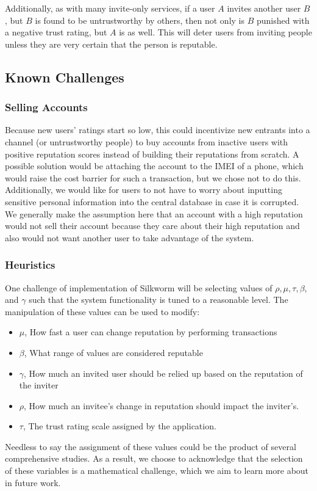 \documentclass[letterpaper,twocolumn,10pt]{article}
\begin{document}
Additionally, as with many invite-only services, if a user $A$ invites another user $B$, but $B$ is found to be untrustworthy by others, then not only is $B$ punished with a negative trust rating, but $A$ is as well. This will deter users from inviting people unless they are very certain that the person is reputable.

\subsection{Known Challenges}

\subsubsection{Selling Accounts}
Because new users' ratings start so low, this could incentivize new entrants into a channel (or untrustworthy people) to buy accounts from inactive users with positive reputation scores instead of building their reputations from scratch. A possible solution would be attaching the account to the IMEI of a phone, which would raise the cost barrier for such a transaction, but we chose not to do this. Additionally, we would like for users to not have to worry about inputting sensitive personal information into the central database in case it is corrupted. We generally make the assumption here that an account with a high reputation would not sell their account because they care about their high reputation and also would not want another user to take advantage of the system. 

\subsubsection{Heuristics}
One challenge of implementation of Silkworm will be selecting values of $\rho, \mu, \tau, \beta$, and $\gamma$
such that the system functionality is tuned to a reasonable level. The manipulation of these values can be used to modify:
\begin{itemize}
    \item $\mu$, How fast a user can change reputation by performing transactions
    \item $\beta$, What range of values are considered reputable
    \item $\gamma$, How much an invited user should be relied up based on the reputation of the inviter
    \item $\rho$, How much an invitee's change in reputation should impact the inviter's.
    \item $\tau$, The trust rating scale assigned by the application.
\end{itemize}
Needless to say the assignment of these values could be the product of several comprehensive studies. As a result, we choose to acknowledge that the selection of these variables is a mathematical challenge, which we aim to learn more about in future work. 
\end{document}
